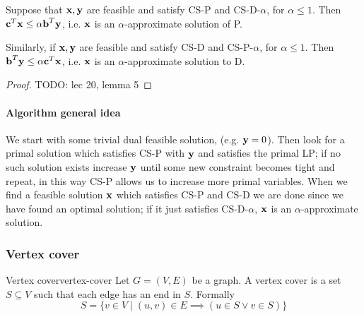 \documentclass[12pt]{extarticle}
\renewcommand{\vec}[1]{\bvec{#1}}
\begin{document}
\begin{proposition}{}{}
	Suppose that $\vec x, \vec y$ are feasible and satisfy CS-P and CS-D-$\alpha$,
	for $\alpha \leq 1$. Then $\vec c^T \vec x \leq \alpha \vec b^T \vec y$, i.e. $\vec x$ is an
	$\alpha$-approximate solution of P.

	Similarly, if $\vec x, \vec y$ are feasible and satisfy CS-D and CS-P-$\alpha$,
	for $\alpha \leq 1$. Then $\vec b^T \vec y \leq \alpha \vec c^T \vec x$, i.e. $\vec x$ is an
	$\alpha$-approximate solution to D.
\end{proposition}

\begin{proof}
	TODO: lec 20, lemma 5
\end{proof}

\paragraph{Algorithm general idea}

We start with some trivial dual feasible solution, (e.g. $\vec y = 0$).
Then look for a primal solution which satisfies CS-P with $\vec y$ and satisfies the primal LP; if
no such solution exists increase $\vec y$ until some new constraint becomes tight and repeat, in
this way CS-P allows us to increase more primal variables.
When we find a feasible solution $\vec x$ which satisfies CS-P and CS-D we are done since we have
found an optimal solution; if it just satisfies CS-D-$\alpha$, $\vec x$ is an $\alpha$-approximate
solution.

\subsubsection{Vertex cover}

\begin{definition}{Vertex cover}{vertex-cover}
	Let $G = (V, E)$ be a graph. A vertex cover is a set $S \subseteq V$ such that each edge has an
	end in $S$. Formally
	\begin{equation}
		S = \{ v \in V \mid (u, v) \in E \implies (u \in S \lor v \in S) \}
	\end{equation}
\end{definition}
\end{document}
